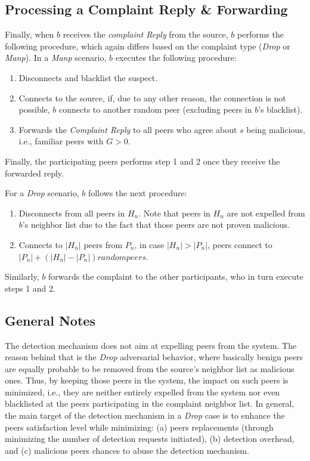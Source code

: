 \subsection{Processing a Complaint Reply \& Forwarding}

Finally, when $b$ receives the \textit{complaint Reply} from the source, $b$ performs the following procedure,
which again differs based on the complaint type (\textit{Drop} or \textit{Manp}).
In a \textit{Manp} scenario, $b$ executes the following procedure:
\begin{enumerate}
 \item Disconnects and blacklist the suspect.
 \item Connects to the source, if, due to any other reason, the connection is not possible, $b$ connects to another random peer (excluding peers in $b$'s blacklist).
 \item Forwards the \textit{Complaint Reply} to all peers who agree about $s$ being malicious, i.e., familiar peers with $G > 0$.
\end{enumerate}
Finally, the participating peers performs step 1 and 2 once they receive the forwarded reply.

For a \textit{Drop} scenario, $b$ follows the next procedure:
\begin{enumerate}
 \item Disconnects from all peers in $H_n$. Note that peers in $H_n$ are not expelled from $b$'s neighbor list due to the fact that those peers are not proven malicious.
 \item Connects to $|H_n|$ peers from $P_n$, in case $|H_n|>|P_n|$, peers connect to $|P_n|+(|H_n|-|P_n|)random peers$.
\end{enumerate}
Similarly, $b$ forwards the complaint to the other participants, who in turn execute steps 1 and 2.

\subsection{General Notes}
The detection mechanism does not aim at expelling peers from the system.
The reason behind that is the \textit{Drop} adversarial behavior, where basically benign peers are equally probable to be removed from the source's neighbor list as malicious ones.
Thus, by keeping those peers in the system, the impact on such peers is minimized, i.e., they are neither entirely expelled from the system nor even blacklisted at the peers participating in the complaint neighbor list.
In general, the main target of the detection mechanism in a \textit{Drop} case is to enhance the peers satisfaction level while minimizing: (a) peers replacements (through minimizing the number of detection requests initiated), (b) detection overhead, and (c) malicious peers chances to abuse the detection mechanism.

